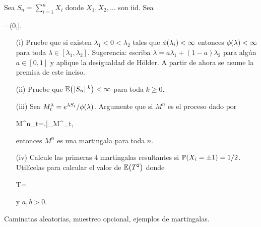 \begin{problema}
	Sea $S_n=\sum_{i=1}^n X_i$ donde $X_1,X_2,\ldots$ son iid. Sea
	
	\begin{esn}
		\imf{\phi}{\lambda}=\in (0,\infty].
	\end{esn}

	\begin{enumerate}
		\item[(i)]
			Pruebe que si existen $\lambda_1<0<\lambda_2$ tales que $\phi\!\left( \lambda_i\right) <\infty$ entonces $\phi\!\left( \lambda\right) <\infty$ para toda $\lambda\in [\lambda_1,\lambda_2]$. Sugerencia: escriba $\lambda=a\lambda_1+(1-a)\lambda_2$ para alg\'un $a\in [0,1]$ y aplique la desigualdad de H\"older. A partir de ahora se asume la premisa de este inciso.
		\item[(ii)] 
			Pruebe que $\mathbb{E}\! \left( \hspace{.25mm}\left|S_n\right|\hspace{.25mm}^k \right)<\infty$ para toda $k\geq 0$. 
		\item[(iii)] 
			Sea $M^\lambda_t=e^{\lambda S_t}/\phi\!\left( \lambda\right) $. Argumente que si $M^n$ es el proceso dado por
			
			\begin{esn}
				M^n_t=\left.\right|_{}M^\lambda_t,
			\end{esn}
			
			entonces $M^n$ es una martingala para toda $n$. 
		\item[(iv)] 
			Calcule las primeras $4$ martingalas resultantes si $\mathbb{P}\! \left( X_i=\pm 1 \right)=1/2$. Util\'icelas para calcular el valor de $\mathbb{E}\! \left( T^2 \right)$ donde

			\begin{esn}
				T=\min\set{n\geq 0: S_n\in\set{-a,b}}
			\end{esn}y $a,b>0$. 
	\end{enumerate}

	 Caminatas aleatorias, muestreo opcional, ejemplos de martingalas. 
\end{problema}